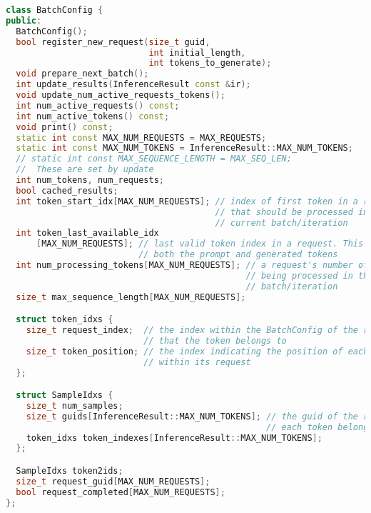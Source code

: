 \begin{lstlisting}[language=C++, caption=BatchConfig, breaklines=true, basicstyle=\footnotesize, frame=single, label=batchConfigListing]
class BatchConfig {
public:
  BatchConfig();
  bool register_new_request(size_t guid,
                            int initial_length,
                            int tokens_to_generate);
  void prepare_next_batch();
  int update_results(InferenceResult const &ir);
  void update_num_active_requests_tokens();
  int num_active_requests() const;
  int num_active_tokens() const;
  void print() const;
  static int const MAX_NUM_REQUESTS = MAX_REQUESTS;
  static int const MAX_NUM_TOKENS = InferenceResult::MAX_NUM_TOKENS;
  // static int const MAX_SEQUENCE_LENGTH = MAX_SEQ_LEN;
  //  These are set by update
  int num_tokens, num_requests;
  bool cached_results;
  int token_start_idx[MAX_NUM_REQUESTS]; // index of first token in a request
                                         // that should be processed in the
                                         // current batch/iteration
  int token_last_available_idx
      [MAX_NUM_REQUESTS]; // last valid token index in a request. This includes
                          // both the prompt and generated tokens
  int num_processing_tokens[MAX_NUM_REQUESTS]; // a request's number of tokens
                                               // being processed in the current
                                               // batch/iteration
  size_t max_sequence_length[MAX_NUM_REQUESTS];

  struct token_idxs {
    size_t request_index;  // the index within the BatchConfig of the request
                           // that the token belongs to
    size_t token_position; // the index indicating the position of each token
                           // within its request
  };

  struct SampleIdxs {
    size_t num_samples;
    size_t guids[InferenceResult::MAX_NUM_TOKENS]; // the guid of the request
                                                   // each token belongs to
    token_idxs token_indexes[InferenceResult::MAX_NUM_TOKENS];
  };

  SampleIdxs token2ids;
  size_t request_guid[MAX_NUM_REQUESTS];
  bool request_completed[MAX_NUM_REQUESTS];
};
\end{lstlisting}

